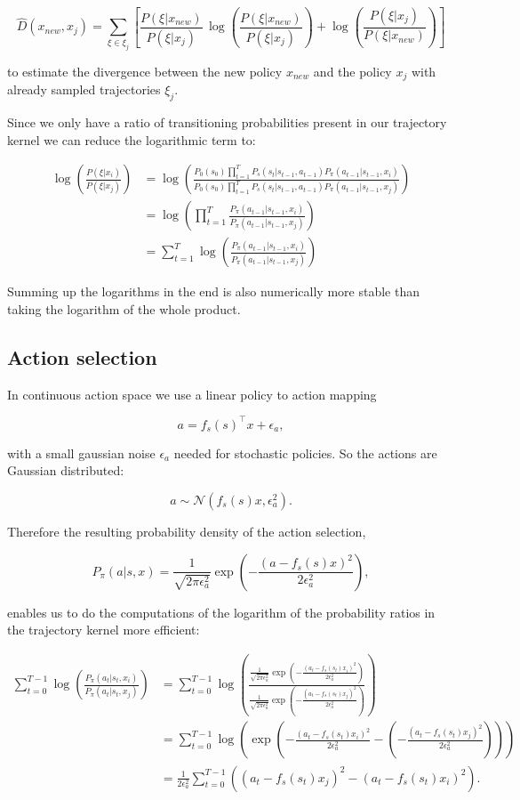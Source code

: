 $$\hat{D}(x_{ new }, x_{ j }) = \sum _{\xi \in \xi_j} \left[\frac{P(\xi|x_{ new })}{P(\xi|x_{ j })}\,\log\left(\frac{P(\xi|x_{new})}{P(\xi|x_{j})}\right)+\log\left(\frac{P(\xi|x_{ j })}{P(\xi|x_{ new })}\right)\right] $$

to estimate the divergence between the new policy $x_{new}$ and the policy $x_j$ with already sampled trajectories $\xi_j$.

Since we only have a ratio of transitioning probabilities present in our trajectory kernel we can reduce the logarithmic term to:

\begin{align*}
    \log\left(\frac{P(\xi|x_i)}{P(\xi|x_j)}\right)
    &= \log\left(\frac{P_{0}(s_{0}) \prod_{t=1}^{T} P_s(s_{t}|s_{t-1},a_{t-1}) P_{\pi}(a_{t-1}|s_{t-1},x_i)}{P_{0}(s_{0}) \prod_{t=1}^{T} P_s(s_{t}|s_{t-1},a_{t-1}) P_{\pi}(a_{t-1}|s_{t-1},x_j)}\right)\\
    &= \log\left(\prod_{t=1}^{T}\frac{ P_{\pi}(a_{t-1}|s_{t-1},x_i)}{P_{\pi}(a_{t-1}|s_{t-1},x_j)}\right)\\
    &= \sum_{t=1}^{T} \log \left(\frac{P_{\pi}(a_{t-1}|s_{t-1},x_i)}{P_{\pi}(a_{t-1}|s_{t-1},x_j)}\right)
\end{align*}


Summing up the logarithms in the end is also numerically more stable than taking the logarithm of the whole product.

\subsection{Action selection}

In continuous action space we use a linear policy to action mapping

$$a = f_s(s)^\top x + \epsilon_a,$$

with a small gaussian noise $\epsilon_a$ needed for stochastic policies. So the actions are Gaussian distributed:

$$a \sim \mathcal{N}(f_s(s) x,\epsilon_a^2).$$

Therefore the resulting probability density of the action selection,

$$P_{\pi}(a|s,x) = \frac{1}{\sqrt{2\pi\epsilon_a^2}}\exp\left(-\frac{(a-f_s(s)x)^2}{2\epsilon_a^2}\right),$$

enables us to do the computations of the logarithm of the probability ratios in the trajectory kernel more efficient:

\begin{align*}
    \sum_{t=0}^{T-1} \log \left(\frac{P_{\pi}(a_{t}|s_{t},x_i)}{P_{\pi}(a_{t}|s_{t},x_j)}\right) &= \sum_{t=0}^{T-1} \log \left(\frac{\frac{1}{\sqrt{2\pi\epsilon_a^2}}\exp\left(-\frac{(a_t-f_s(s_t)x_i)^2}{2\epsilon_a^2}\right)}{\frac{1}{\sqrt{2\pi\epsilon_a^2}}\exp\left(-\frac{(a_t-f_s(s_t)x_j)^2}{2\epsilon_a^2}\right)}\right)\\
    &= \sum_{t=0}^{T-1} \log \left( \exp \left( -\frac{(a_t-f_s(s_t)x_i)^2}{2\epsilon_a^2} - \left(-\frac{(a_t-f_s(s_t)x_j)^2}{2\epsilon_a^2}\right)\right)\right)\\
    &= \frac{1}{2\epsilon_a^2} \sum_{t=0}^{T-1} \left((a_t-f_s(s_t)x_j)^2 - (a_t-f_s(s_t)x_i)^2\right).
\end{align*}


